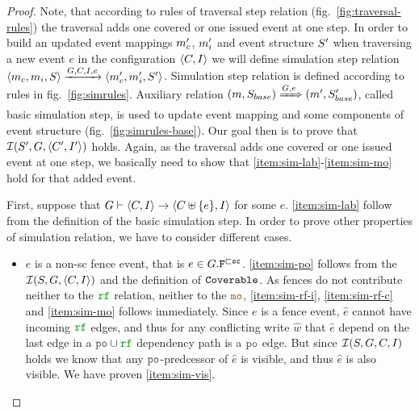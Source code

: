 \documentclass[12pt]{article}
\begin{document}
\begin{proof}
  
  Note, that according to rules of traversal step relation (fig.~\ref{fig:traversal-rules})
  the traversal adds one covered or one issued event at one step.
  In order to build an updated event mappings $m_{c}'$, $m_{i}'$ 
  and event structure $S'$ 
  when traversing a new event $e$ in the configuration $\langle C, I \rangle$
  we will define simulation step relation 
  $\langle m_{c}, m_{i}, S \rangle \xrightarrow{G, C, I, e} \langle m_{c}', m_{i}', S' \rangle$.
  Simulation step relation is defined according to rules in fig.~\ref{fig:simrules}.
  Auxiliary relation 
  $(m, S_{base}) \xRightarrow{G, e} (m', S'_{base})$,
  called basic simulation step, 
  is used to update event mapping and some components of event structure
  (fig.~\ref{fig:simrules-base}).
  Our goal then is to prove that $\mathcal{I}(S', G, \langle C', I' \rangle)$ holds.
  Again, as the traversal adds one covered or one issued event at one step,
  we basically need to show that \ref{item:sim-lab}-\ref{item:sim-mo} hold
  for that added event.

  First, suppose that 
  $G \vdash \langle C, I \rangle \rightarrow \langle C \uplus \{e\}, I \rangle$ for some $e$.
  \ref{item:sim-lab} follow from the definition of the basic simulation step.
  In order to prove other properties of simulation relation,
  we have to consider different cases.

  \begin{itemize}
    \item $e$ is a non-sc fence event, that is $e \in G.{\mathtt{F}}^{\sqsubset{\mathtt{sc}}}$.
      \ref{item:sim-po} follows from the $\mathcal{I}(S, G, \langle C, I \rangle)$ 
      and the definition of ${\mathtt{Coverable}}$.
      As fences do not contribute neither to the $\lRF$ relation, neither to the $\lMO$, 
      \ref{item:sim-rf-i}, \ref{item:sim-rf-c} and \ref{item:sim-mo} follows immediately.
      Since $e$ is a fence event, $\hat{e}$ cannot have incoming $\lRF$ edges,
      and thus for any conflicting write $\hat{w}$ that $\hat{e}$ depend on
      the last edge in a $\lPO \cup \lRF$ dependency path is a $\lPO$ edge.
      But since $\mathcal{I}(S, G, C, I)$ holds we know that 
      any $\lPO$-predcessor of $\hat{e}$ is visible, and thus $\hat{e}$ is also visible.
      We have proven \ref{item:sim-vis}.


\end{itemize}
\end{proof}
\end{document}
